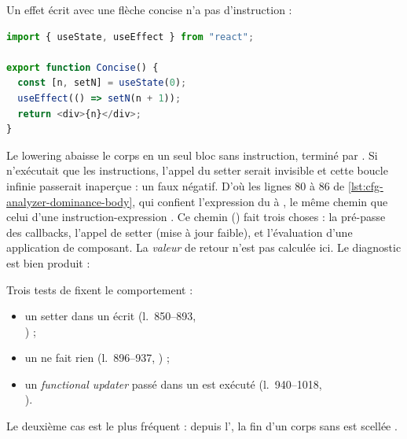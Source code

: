 Un effet écrit avec une flèche concise n'a pas d'instruction :

\begin{lstlisting}[language=TypeScript,caption={Une flèche concise (\file{/tmp/ch12/concise.tsx})},label={lst:cfg-analyzer-dominance-concise}]
import { useState, useEffect } from "react";

export function Concise() {
  const [n, setN] = useState(0);
  useEffect(() => setN(n + 1));
  return <div>{n}</div>;
}
\end{lstlisting}

Le lowering abaisse le corps  en un seul bloc sans
instruction, terminé par . Si
 n'exécutait que les instructions, l'appel du setter serait
invisible et cette boucle infinie passerait inaperçue : un faux négatif. D'où
les lignes 80 à 86 de \cref{lst:cfg-analyzer-dominance-body}, qui confient
l'expression du  à , le même chemin que
celui d'une instruction-expression . Ce chemin
() fait trois choses : la
pré-passe des callbacks, l'appel de setter (mise à jour faible), et
l'évaluation d'une application de composant. La \emph{valeur} de retour n'est
pas calculée ici. Le diagnostic est bien produit :


Trois tests de  fixent le comportement :
\begin{itemize}
  \item un setter dans un  écrit (l.~850--893,\\
    ) ;
  \item un  ne fait rien (l.~896--937,
    ) ;
  \item un \emph{functional updater} passé dans un  est exécuté
    (l.~940--1018,\\ ).
\end{itemize}
Le deuxième cas est le plus fréquent : depuis l', la fin d'un corps
sans  est scellée .

